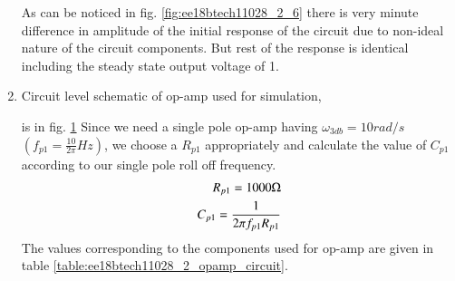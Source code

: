 \begin{enumerate}[label=\arabic*.,ref=\theenumi]
As can be noticed in fig. \ref{fig:ee18btech11028_2_6} there is very minute difference in amplitude of the initial response of the circuit due to non-ideal nature of the circuit components. But rest of the response is identical including the steady state output voltage of 1.
\item
Circuit level schematic of op-amp used for simulation,
\begin{figure}[!ht]
	\begin{center}
		\resizebox{4\columnwidth/5}{!}{}
	\end{center}
\caption{}
\label{fig:ee18btech11028_2_7}
\end{figure}
is in fig. \ref{fig:ee18btech11028_2_7}
Since we need a single pole op-amp having $\omega_{3db}  =  10 rad/s$  $(f_{p1} = \frac{10}{2\pi} Hz)$,
we choose a $R_{p1}$ appropriately and calculate the value of $C_{p1}$ according to our single pole roll off frequency.
\begin{align}
    R_{p1}  = 1000 \ohm
    \\
    C_{p1} = \frac{1}{2  \pi f_{p1} R_{p1}}
\end{align}
The values corresponding to the components used for op-amp are given in table \ref{table:ee18btech11028_2_opamp_circuit}. 
\begin{table}[!ht]
    \centering
    
    \caption{}
    \label{table:ee18btech11028_2_opamp_circuit}
\end{table}




\end{enumerate}
